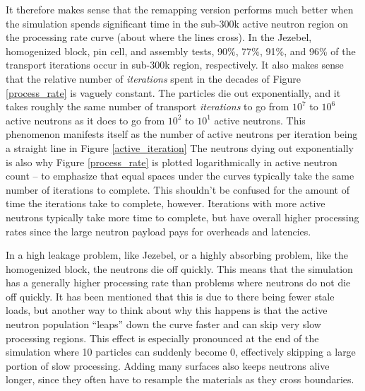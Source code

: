 It therefore makes sense that the remapping version performs much better when the simulation spends significant time in the sub-300k active neutron region on the processing rate curve (about where the lines cross).  In the Jezebel, homogenized block, pin cell, and assembly tests, 90\%, 77\%, 91\%, and 96\% of the transport iterations occur in sub-300k region, respectively.%
 It also makes sense that the relative number of \emph{iterations} spent in the decades of Figure \ref{process_rate} is vaguely constant. %
  The particles die out exponentially, and it takes roughly the same number of transport \emph{iterations} to go from $10^7$ to $10^6$ active neutrons as it does to go from $10^2$ to $10^1$ active neutrons.  This phenomenon manifests itself as the number of active neutrons per iteration being a straight line in Figure \ref{active_iteration} %
  The neutrons dying out exponentially is also why Figure \ref{process_rate} is plotted logarithmically in active neutron count -- to emphasize that equal spaces under the curves typically take the same number of iterations to complete.  This shouldn't be confused for the amount of time the iterations take to complete, however.  Iterations with more active neutrons typically take more time to complete, but have overall higher processing rates since the large neutron payload pays for overheads and latencies.

In a high leakage problem, like Jezebel, or a highly absorbing problem, like the homogenized block, the neutrons die off quickly.  This means that the simulation has a generally higher processing rate than problems where neutrons do not die off quickly.  It has been mentioned that this is due to there being fewer stale loads, but another way to think about why this happens is that the active neutron population ``leaps'' down the curve faster and can skip very slow processing regions.  This effect is especially pronounced at the end of the simulation where 10 particles can suddenly become 0, effectively skipping a large portion of slow processing.  Adding many surfaces also keeps neutrons alive longer, since they often have to resample the materials as they cross boundaries.  


